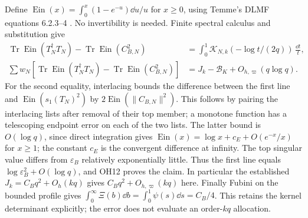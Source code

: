 \documentclass[11pt]{article}
\newcommand{\Tr}{\operatorname{Tr}}\newcommand{\diag}{\operatorname{diag}}
\newcommand{\eps}{\varepsilon}
\begin{document}
Define $\operatorname{Ein}(x)=\int_0^x(1-e^{-u})\dd u/u$ for $x\ge0$,
using Temme's DLMF equations 6.2.3--4 \cite{E1}.
No invertibility is needed. Finite spectral calculus and substitution give
\begin{equation}\tag{OH18}\begin{aligned}
 \Tr\operatorname{Ein}(T_N^\dagger T_N)
 -\Tr\operatorname{Ein}(C_{B,N}^2)
 &=\int_0^1\mathscr K_{N,k}(-\log t/(2q))\,\frac{\dd t}{t},\\
 \sum w_N[\Tr\operatorname{Ein}(T_N^\dagger T_N)
 -\Tr\operatorname{Ein}(C_{B,N}^2)]
 &=J_k-\mathcal B_K+O_{h,\varpi}(q\log q).
\end{aligned}\end{equation}
For the second equality, interlacing bounds the difference between the
first line and $\operatorname{Ein}(s_1(T_N)^2)$ by
$2\operatorname{Ein}(\|C_{B,N}\|^2)$. This follows by pairing the
interlacing lists after removal of their top member; a monotone
function has a telescoping endpoint error on each of the two lists.
The latter bound is $O(\log q)$, since direct integration gives
$\operatorname{Ein}(x)=\log x+c_E+O(e^{-x}/x)$ for $x\ge1$;
the constant $c_E$ is the convergent difference at infinity.
The top singular value differs from $\eps_B$ relatively exponentially
little. Thus the first line equals $\log\eps_B^2+O(\log q)$, and
OH12 proves the claim. In particular the established
$J_k=C_Bq^2+O_h(kq)$ gives $C_Bq^2+O_{h,\varpi}(kq)$ here.
Finally Fubini on the bounded profile gives
$\int_0^\infty\Xi(b)\dd b=\int_0^1\psi(s)\dd s=C_B/4$.
This retains the kernel determinant explicitly; the error does not
evaluate an order-$kq$ allocation.
\end{document}
